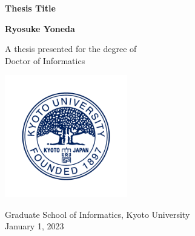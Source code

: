 \begin{titlepage}
  \begin{center}
      
      \vspace*{1cm}

      \Huge

      \textbf{Thesis Title}

      \vspace{2cm}

      \textbf{Ryosuke Yoneda}

      \vfill

      A thesis presented for the degree of\\
      Doctor of Informatics

      \vspace{0.8cm}

      \includegraphics[width=0.4\textwidth]{figs/logo.png}
      
      \Large
      Graduate School of Informatics, Kyoto University\\
      January 1, 2023
          
  \end{center}
\end{titlepage}
